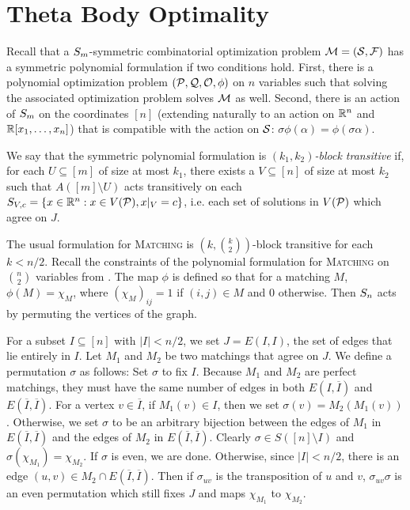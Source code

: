 \section{Theta Body Optimality}\label{sec:thetabodyoptimality}
Recall that a $S_{m}$-symmetric combinatorial optimization problem $\mathcal M = (\mathcal S, \mathcal F)$ has a symmetric polynomial formulation if two conditions hold. First, there is a polynomial optimization problem $(\mathcal P, \mathcal Q, \mathcal O, \phi)$ on $n$ variables such that solving the associated optimization problem solves $\mathcal M$ as well. Second, there is an action of $S_{m}$ on the coordinates $[n]$ (extending naturally to an action on $\mathbb R^n$ and $\mathbb R[x_1,\dots,x_n]$) that is compatible with the action on $\mathcal S$: $\sigma\phi(\alpha) = \phi(\sigma \alpha)$. 
\begin{definition}
We say that the symmetric polynomial formulation is \emph{$(k_1,k_2)$-block transitive} if, for each $U \subseteq [m]$ of size at most $k_1$, there exists a $V \subseteq [n]$ of size at most $k_2$ such that $A([m] \setminus U)$ acts transitively on each $S_{V,c} = \{x \in \mathbb R^n: x \in V(\mathcal P), x|_V = c\}$, i.e. each set of solutions in $V(\mathcal P)$ which agree on $J$.
\end{definition}
\begin{example}\label{ex:matching-blocktransitive}
The usual formulation for \textsc{Matching} is $\left(k,\binom{k}{2}\right)$-block transitive for each $k < n/2$. Recall the constraints of the polynomial formulation for \textsc{Matching} on $\binom{n}{2}$ variables from . The map $\phi$ is defined so that for a matching $M$, $\phi(M) = \chi_M$, where $(\chi_M)_{ij} = 1$ if $(i,j) \in M$ and $0$ otherwise. Then $S_{n}$ acts by permuting the vertices of the graph.

For a subset $I \subseteq [n]$ with $|I| < n/2$, we set $J = E(I,I)$, the set of edges that lie entirely in $I$. Let $M_1$ and $M_2$ be two matchings that agree on $J$. We define a permutation $\sigma$ as follows: Set $\sigma$ to fix $I$. Because $M_1$ and $M_2$ are perfect matchings, they must have the same number of edges in both $E(I, \overline{I})$ and $E(\overline{I},\overline{I})$. For a vertex $v \in \overline{I}$, if $M_1(v) \in I$, then we set $\sigma(v) = M_2(M_1(v))$. Otherwise, we set $\sigma$ to be an arbitrary bijection between the edges of $M_1$ in $E(\overline{I},\overline{I})$ and the edges of $M_2$ in $E(\overline{I},\overline{I})$. Clearly $\sigma \in S([n]\setminus I)$ and $\sigma(\chi_{M_1}) = \chi_{M_2}$. If $\sigma$ is even, we are done. Otherwise, since $|I| < n/2$, there is an edge $(u,v) \in M_2 \cap E(\overline{I},\overline{I})$. Then if $\sigma_{uv}$ is the transposition of $u$ and $v$, $\sigma_{uv}\sigma$ is an even permutation which still fixes $J$ and maps $\chi_{M_1}$ to $\chi_{M_2}$.
\end{example}

